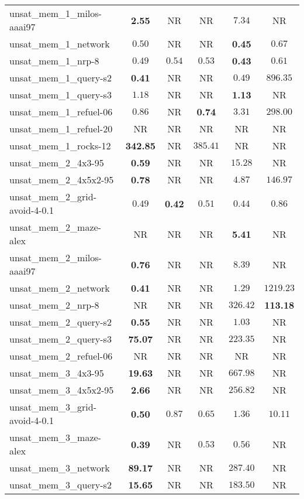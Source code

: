 \begin{tabular}{lccccc}
unsat\_mem\_1\_milos-aaai97 & \textbf{2.55} & NR & NR & $7.34$ & NR \\
unsat\_mem\_1\_network & $0.50$ & NR & NR & \textbf{0.45} & $0.67$ \\
unsat\_mem\_1\_nrp-8 & $0.49$ & $0.54$ & $0.53$ & \textbf{0.43} & $0.61$ \\
unsat\_mem\_1\_query-s2 & \textbf{0.41} & NR & NR & $0.49$ & $896.35$ \\
unsat\_mem\_1\_query-s3 & $1.18$ & NR & NR & \textbf{1.13} & NR \\
unsat\_mem\_1\_refuel-06 & $0.86$ & NR & \textbf{0.74} & $3.31$ & $298.00$ \\
unsat\_mem\_1\_refuel-20 & NR & NR & NR & NR & NR \\
unsat\_mem\_1\_rocks-12 & \textbf{342.85} & NR & $385.41$ & NR & NR \\
unsat\_mem\_2\_4x3-95 & \textbf{0.59} & NR & NR & $15.28$ & NR \\
unsat\_mem\_2\_4x5x2-95 & \textbf{0.78} & NR & NR & $4.87$ & $146.97$ \\
unsat\_mem\_2\_grid-avoid-4-0.1 & $0.49$ & \textbf{0.42} & $0.51$ & $0.44$ & $0.86$ \\
unsat\_mem\_2\_maze-alex & NR & NR & NR & \textbf{5.41} & NR \\
unsat\_mem\_2\_milos-aaai97 & \textbf{0.76} & NR & NR & $8.39$ & NR \\
unsat\_mem\_2\_network & \textbf{0.41} & NR & NR & $1.29$ & $1219.23$ \\
unsat\_mem\_2\_nrp-8 & NR & NR & NR & $326.42$ & \textbf{113.18} \\
unsat\_mem\_2\_query-s2 & \textbf{0.55} & NR & NR & $1.03$ & NR \\
unsat\_mem\_2\_query-s3 & \textbf{75.07} & NR & NR & $223.35$ & NR \\
unsat\_mem\_2\_refuel-06 & NR & NR & NR & NR & NR \\
unsat\_mem\_3\_4x3-95 & \textbf{19.63} & NR & NR & $667.98$ & NR \\
unsat\_mem\_3\_4x5x2-95 & \textbf{2.66} & NR & NR & $256.82$ & NR \\
unsat\_mem\_3\_grid-avoid-4-0.1 & \textbf{0.50} & $0.87$ & $0.65$ & $1.36$ & $10.11$ \\
unsat\_mem\_3\_maze-alex & \textbf{0.39} & NR & $0.53$ & $0.56$ & NR \\
unsat\_mem\_3\_network & \textbf{89.17} & NR & NR & $287.40$ & NR \\
unsat\_mem\_3\_query-s2 & \textbf{15.65} & NR & NR & $183.50$ & NR \\

\end{tabular}
